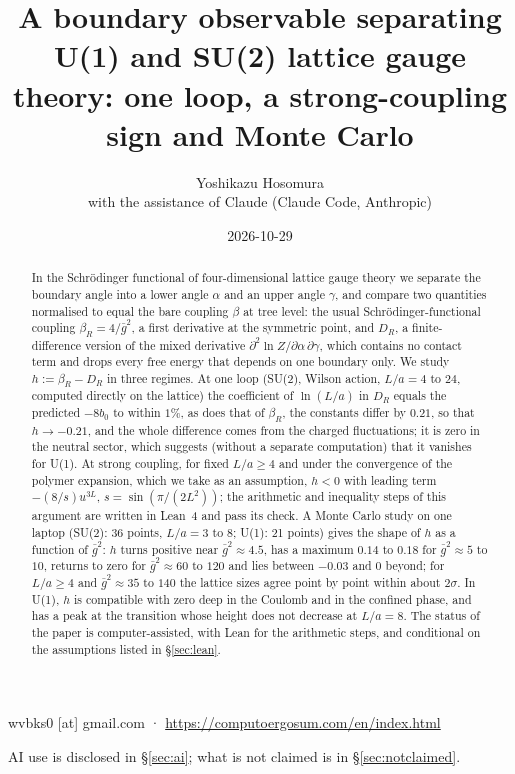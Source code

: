 \documentclass[11pt,a4paper]{article}
\title{A boundary observable separating U(1) and SU(2) lattice gauge theory: one loop, a strong-coupling sign and Monte Carlo}
\author{Yoshikazu Hosomura\\[.3em]\normalsize with the assistance of Claude (Claude Code, Anthropic)}
\date{2026-10-29}
\theoremstyle{definition}
\theoremstyle{remark}
\newcommand{\gb}{\bar g^{2}}
\newcommand{\bR}{\beta_R}
\newcommand{\DR}{D_R}
\begin{document}
\maketitle
\begin{center}\small wvbks0 [at] gmail.com · \url{https://computoergosum.com/en/index.html}\end{center}
\begin{center}\small AI use is disclosed in \S\ref{sec:ai}; what is not claimed is in \S\ref{sec:notclaimed}.\end{center}

\begin{abstract}
In the Schrödinger functional of four-dimensional lattice gauge theory we separate the boundary angle into a lower angle $\alpha$ and an upper angle $\gamma$, and compare two quantities normalised to equal the bare coupling $\beta$ at tree level: the usual Schrödinger-functional coupling $\bR=4/\gb$, a first derivative at the symmetric point, and $\DR$, a finite-difference version of the mixed derivative $\partial^2\ln Z/\partial\alpha\,\partial\gamma$, which contains no contact term and drops every free energy that depends on one boundary only. We study $h:=\bR-\DR$ in three regimes. At one loop (SU(2), Wilson action, $L/a=4$ to $24$, computed directly on the lattice) the coefficient of $\ln(L/a)$ in $\DR$ equals the predicted $-8b_0$ to within $1\%$, as does that of $\bR$, the constants differ by $0.21$, so that $h\to-0.21$, and the whole difference comes from the charged fluctuations; it is zero in the neutral sector, which suggests (without a separate computation) that it vanishes for U(1). At strong coupling, for fixed $L/a\ge4$ and under the convergence of the polymer expansion, which we take as an assumption, $h<0$ with leading term $-(8/s)u^{3L}$, $s=\sin(\pi/(2L^2))$; the arithmetic and inequality steps of this argument are written in Lean~4 and pass its check. A Monte Carlo study on one laptop (SU(2): 36 points, $L/a=3$ to $8$; U(1): 21 points) gives the shape of $h$ as a function of $\gb$: $h$ turns positive near $\gb\approx4.5$, has a maximum $0.14$ to $0.18$ for $\gb\approx5$ to $10$, returns to zero for $\gb\approx60$ to $120$ and lies between $-0.03$ and $0$ beyond; for $L/a\ge4$ and $\gb\approx35$ to $140$ the lattice sizes agree point by point within about $2\sigma$. In U(1), $h$ is compatible with zero deep in the Coulomb and in the confined phase, and has a peak at the transition whose height does not decrease at $L/a=8$. The status of the paper is computer-assisted, with Lean for the arithmetic steps, and conditional on the assumptions listed in \S\ref{sec:lean}.
\end{abstract}
\end{document}
